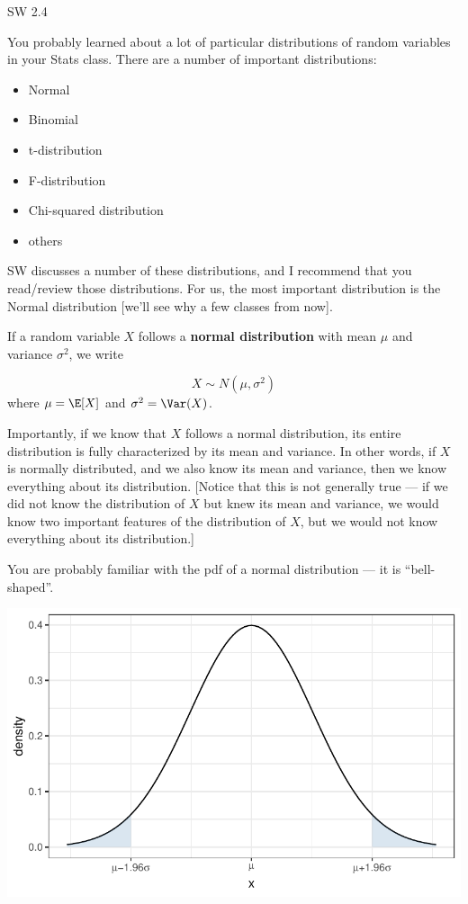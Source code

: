 \documentclass[
  letterpaper,
  DIV=11,
  numbers=noendperiod]{scrreprt}
\begin{document}
SW 2.4

You probably learned about a lot of particular distributions of random
variables in your Stats class. There are a number of important
distributions:

\begin{itemize}
\item
  Normal
\item
  Binomial
\item
  t-distribution
\item
  F-distribution
\item
  Chi-squared distribution
\item
  others
\end{itemize}

SW discusses a number of these distributions, and I recommend that you
read/review those distributions. For us, the most important distribution
is the Normal distribution {[}we'll see why a few classes from now{]}.

If a random variable \(X\) follows a \textbf{normal distribution} with
mean \(\mu\) and variance \(\sigma^2\), we write

\[
  X \sim N(\mu, \sigma^2)
\] where \(\mu = \E[X]\) and \(\sigma^2 = \Var(X)\).

Importantly, if we know that \(X\) follows a normal distribution, its
entire distribution is fully characterized by its mean and variance. In
other words, if \(X\) is normally distributed, and we also know its mean
and variance, then we know everything about its distribution. {[}Notice
that this is not generally true --- if we did not know the distribution
of \(X\) but knew its mean and variance, we would know two important
features of the distribution of \(X\), but we would not know everything
about its distribution.{]}

You are probably familiar with the pdf of a normal distribution --- it
is ``bell-shaped''.

\includegraphics{04-expectations_files/figure-pdf/unnamed-chunk-2-1.pdf}
\end{document}
